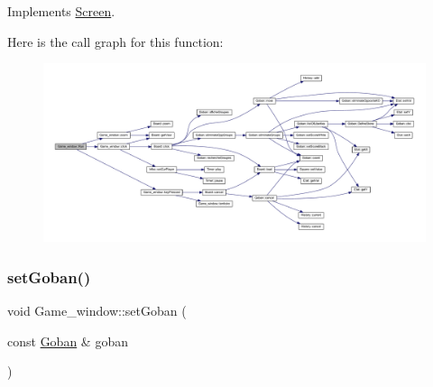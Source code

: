 Implements \hyperlink{class_screen_abbb6a9b3d8fdc44620080e54d090e8c7}{Screen}.

Here is the call graph for this function\+:
\nopagebreak
\begin{figure}[H]
\begin{center}
\leavevmode
\includegraphics[width=350pt]{class_game__window_a555769f4e8511e45d6623658dc736be5_cgraph}
\end{center}
\end{figure}
\mbox{\label{class_game__window_ac674f6d0db2bf60e92a0072d94e4c019}} 
\subsubsection{\texorpdfstring{set\+Goban()}{setGoban()}}
{\footnotesize\ttfamily void Game\+\_\+window\+::set\+Goban (\begin{DoxyParamCaption}\item[{const \hyperlink{class_goban}{Goban} \&}]{goban }\end{DoxyParamCaption})}

